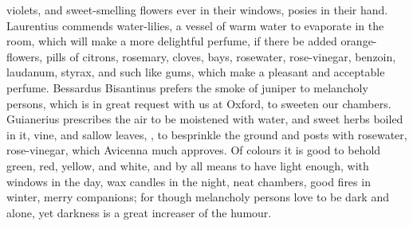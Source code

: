 {violets, and sweet-smelling flowers ever in their windows, posies in
their hand. Laurentius commends water-lilies, a vessel of warm water to
evaporate in the room, which will make a more delightful perfume, if
there be added orange-flowers, pills of citrons, rosemary, cloves,
bays, rosewater, rose-vinegar, benzoin, laudanum, styrax, and such like
gums, which make a pleasant and acceptable perfume. Bessardus
Bisantinus prefers the smoke of juniper to melancholy persons, which is
in great request with us at Oxford, to sweeten our chambers.
Guianerius prescribes the air to be moistened with water, and
sweet herbs boiled in it, vine, and sallow leaves, \etc{},  to
besprinkle the ground and posts with rosewater, rose-vinegar, which
Avicenna much approves. Of colours it is good to behold green, red,
yellow, and white, and by all means to have light enough, with windows
in the day, wax candles in the night, neat chambers, good fires in
winter, merry companions; for though melancholy persons love to be dark
and alone, yet darkness is a great increaser of the humour.

}
